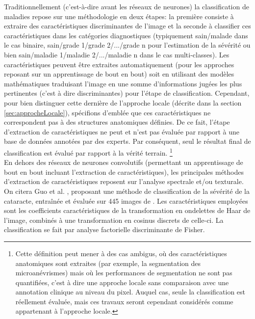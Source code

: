 Traditionnellement (c'est-à-dire avant les réseaux de neurones) la classification de maladies repose sur une méthodologie en deux étapes: la première consiste à extraire des caractéristiques discriminantes de l'image et la seconde à classifier ces caractéristiques dans les catégories diagnostiques (typiquement sain/malade dans le cas binaire, sain/grade 1/grade 2/.../grade n pour l'estimation de la sévérité ou bien sain/maladie 1/maladie 2/.../maladie n dans le cas multi-classes). Les caractéristiques peuvent être extraites automatiquement (pour les approches reposant sur un apprentissage  de bout en bout) soit en utilisant des modèles mathématiques traduisant l'image en une somme d'informations jugées les plus pertinentes (c'est à dire discriminantes) pour l'étape de classification. Cependant, pour bien distinguer cette dernière de l'approche locale
(décrite dans la section \ref{sec:approcheLocale}), spécifions d'emblée que ces caractéristiques ne correspondent pas à des structures anatomiques définies. De ce fait, l'étape d'extraction de caractéristiques ne peut et n'est pas évaluée par rapport à une base de données annotées par des experts. Par conséquent, seul le résultat final de classification est évalué par rapport à la vérité terrain. \footnote{Cette définition peut mener à des cas ambigus, où des caractéristiques anatomiques sont extraites (par exemple, la segmentation des microanévrismes) mais où les performances de segmentation ne sont pas quantifiées, c'est à dire une approche locale sans comparaison avec une annotation clinique au niveau du pixel. Auquel cas, seule la classification est réellement évaluée, mais ces travaux seront cependant considérés comme appartenant à l'approche locale.} \\ 
En dehors des réseaux de neurones convolutifs (permettant un apprentissage de bout en bout incluant l'extraction de caractéristiques), les principales méthodes d'extraction de caractéristiques reposent sur l'analyse spectrale et/ou texturale. On citera Guo et al. \cite{guoComputeraidedHealthcareSystem2015}, proposant une méthode de classification de la sévérité de la cataracte, entraînée et évaluée sur 445 images de \fundus. Les caractéristiques employées sont les coefficients caractéristiques de la transformation en ondelettes de Haar de l'image, combinés à une transformation en cosinus discrets de celle-ci. La classification se fait par analyse factorielle discriminante de Fisher. 
